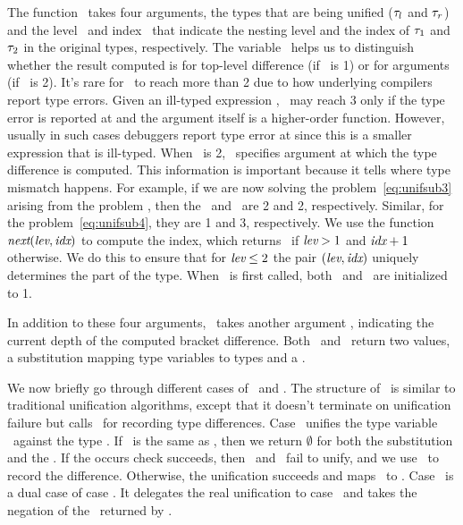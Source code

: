 \documentclass[12pt]{report}	%
\begin{document}
The function \ualg\ takes four arguments, the types that are being
unified ($\tau_l$ and $\tau_r$) and the level \level\ and index \idx\
that indicate the nesting level and the index
of $\tau_1$ and $\tau_2$ in the original types, respectively.
The variable \level\ helps us to distinguish whether the result
computed is for top-level difference (if \level\ is 1) or for
arguments (if \level\ is 2). It's rare for \level\ to reach more
than 2 due to how underlying compilers report type errors.
Given an ill-typed expression , \level\ may reach
3 only if the type error is reported at  and the argument
 itself is a higher-order function. However, usually in
such cases debuggers report type error at \prog{g} since this is
a smaller expression that is ill-typed. When \level\ is 2, \idx\
specifies argument at which the type difference is computed. This
information is important because it tells where type mismatch
happens.
For example, if we are now solving
the problem~\eqref{eq:unifsub3} arising from the problem \mui{\mtexp}{\mtinf},
then the \level\ and \idx\ are 2 and 2,
respectively. Similar, for the problem~\eqref{eq:unifsub4},
they are 1 and 3, respectively.
%
We use the function $\textit{next}(\textit{lev},\textit{idx})$ to compute the index, which
returns \idx\ if $\textit{lev} > 1$ and $\textit{idx}+1$ otherwise. We
do this to ensure that for $\textit{lev} \leq 2$ the pair $(\textit{lev},\textit{idx})$
uniquely determines the part of the type.
%
When \ualg\ is first called, both \level\ and \idx\ are initialized to 1.
%
%

%
In addition to these four arguments, \dalg\ takes another argument \depth,
indicating the current depth of the computed bracket difference. Both
\ualg\ and \dalg\ return two values, a substitution mapping type variables
to types and a \td.

We now briefly go through different cases of \ualg\ and \dalg. The structure of
\ualg\ is similar to traditional unification algorithms, except that it doesn't
terminate on unification failure but calls \dalg\ for recording type
differences. Case \nameva\ unifies the type variable \tv\ against the
type \mt. If \tv\ is the same as \mt, then we return $\emptyset$ for both
the substitution and the \td. If the occurs check succeeds, then \tv\ and \mt\
fail to unify, and we use \dalg\ to record the difference. Otherwise, the
unification succeeds and maps \tv\ to \mt. Case \namevb\ is a dual case of
case \nameva. It delegates the real unification to case \nameva\ and takes
the negation of the \td\ returned by \nameva.
\end{document}

